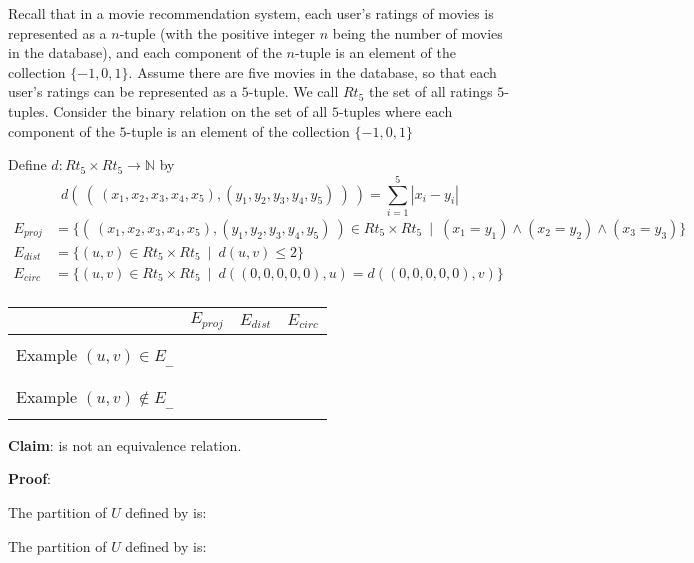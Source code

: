 Recall that 
    in a movie recommendation system, each 
    user's ratings of movies is represented as a $n$-tuple (with the positive integer $n$ 
    being the number of movies in the database), and each component of 
    the $n$-tuple is an element of the collection $\{-1,0,1\}$. Assume there are five movies in the database, 
    so that each user's ratings
    can be represented as a $5$-tuple. We call $Rt_5$ the set of all ratings $5$-tuples.
    Consider the binary relation on the  set of all 
    $5$-tuples where each  component of the $5$-tuple is an element of the collection $\{-1,0,1\}$

    Define $d: Rt_5 \times Rt_5 \to \mathbb{N}$ by
    \[
        d (~(~ (x_1, x_2, x_3, x_4, x_5), (y_1, y_2, y_3, y_4, y_5) ~) ~) = \sum_{i=1}^5 |x_i - y_i|
    \]
\begin{align*}
    E_{proj} &=  \{ ( ~(x_1, x_2, x_3, x_4, x_5), (y_1, y_2, y_3, y_4, y_5)~) \in
         Rt_5 \times Rt_5 ~\mid~(x_1 = y_1) \land  (x_2 = y_2) \land (x_3 = y_3) \}  \\
    E_{dist} &=  \{ (u,v) \in Rt_5 \times Rt_5 ~\mid~ d( u,v ) \leq 2 \}  \\
    E_{circ} &=  \{ (u,v) \in Rt_5 \times Rt_5 ~\mid~ d( (0,0,0,0,0), u ) =  d( (0,0,0,0,0),v) \}  \\
    \end{align*}
    
    \begin{center}
    \begin{tabular}{|c|c|c|c|}
    \hline
     & $E_{proj}$ &  $E_{dist}$ & $E_{circ}$ \\
    \hline & &  &  \\
    Example $(u,v) \in E_{\_\_}$ & \phantom{Put example here} &  \phantom{Put example here}  &  \phantom{Put example here}  \\
    & &  &  \\
    \hline
    & &  &  \\
    Example $(u,v) \notin E_{\_\_}$ & \phantom{Put example here} &  \phantom{Put example here}  &  \phantom{Put example here}  \\
    & &  &  \\
    \hline
    \end{tabular}
    \end{center}
    
    
    {\bf Claim}: \underline{} is not an  equivalence relation.
    
    
    {\bf Proof}:  
    
    \vspace{100pt}
    
    The partition of  $U$ defined by \underline{} is:
    
    \vspace{200pt}
    
    The partition of  $U$ defined by \underline{} is:
    
    \vspace{200pt}
